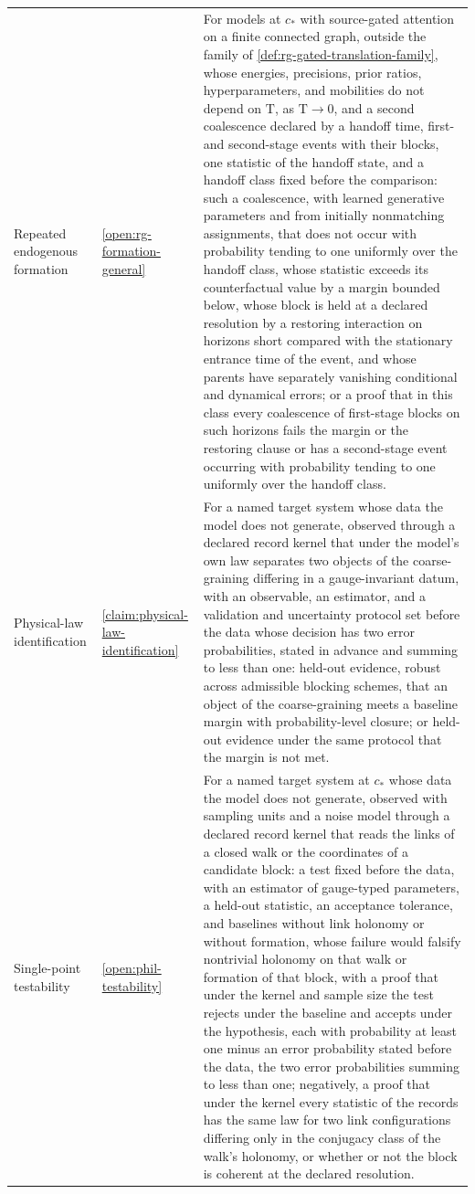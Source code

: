 {\begin{longtable}{@{}>{\raggedright\arraybackslash}p{}
>{\raggedright\arraybackslash}p{}
>{\raggedright\arraybackslash}p{}@{}}
Repeated endogenous formation & \cref{open:rg-formation-general} & For models at $c_*$ with source-gated attention on a finite connected graph, outside the family of \cref{def:rg-gated-translation-family}, whose energies, precisions, prior ratios, hyperparameters, and mobilities do not depend on $\mathrm T$, as $\mathrm T\to0$, and a second coalescence declared by a handoff time, first- and second-stage events with their blocks, one statistic of the handoff state, and a handoff class fixed before the comparison: such a coalescence, with learned generative parameters and from initially nonmatching assignments, that does not occur with probability tending to one uniformly over the handoff class, whose statistic exceeds its counterfactual value by a margin bounded below, whose block is held at a declared resolution by a restoring interaction on horizons short compared with the stationary entrance time of the event, and whose parents have separately vanishing conditional and dynamical errors; or a proof that in this class every coalescence of first-stage blocks on such horizons fails the margin or the restoring clause or has a second-stage event occurring with probability tending to one uniformly over the handoff class. \\
Physical-law identification & \cref{claim:physical-law-identification} & For a named target system whose data the model does not generate, observed through a declared record kernel that under the model's own law separates two objects of the coarse-graining differing in a gauge-invariant datum, with an observable, an estimator, and a validation and uncertainty protocol set before the data whose decision has two error probabilities, stated in advance and summing to less than one: held-out evidence, robust across admissible blocking schemes, that an object of the coarse-graining meets a baseline margin with probability-level closure; or held-out evidence under the same protocol that the margin is not met. \\
Single-point testability & \cref{open:phil-testability} & For a named target system at $c_*$ whose data the model does not generate, observed with sampling units and a noise model through a declared record kernel that reads the links of a closed walk or the coordinates of a candidate block: a test fixed before the data, with an estimator of gauge-typed parameters, a held-out statistic, an acceptance tolerance, and baselines without link holonomy or without formation, whose failure would falsify nontrivial holonomy on that walk or formation of that block, with a proof that under the kernel and sample size the test rejects under the baseline and accepts under the hypothesis, each with probability at least one minus an error probability stated before the data, the two error probabilities summing to less than one; negatively, a proof that under the kernel every statistic of the records has the same law for two link configurations differing only in the conjugacy class of the walk's holonomy, or whether or not the block is coherent at the declared resolution. \\
\end{longtable}
}
